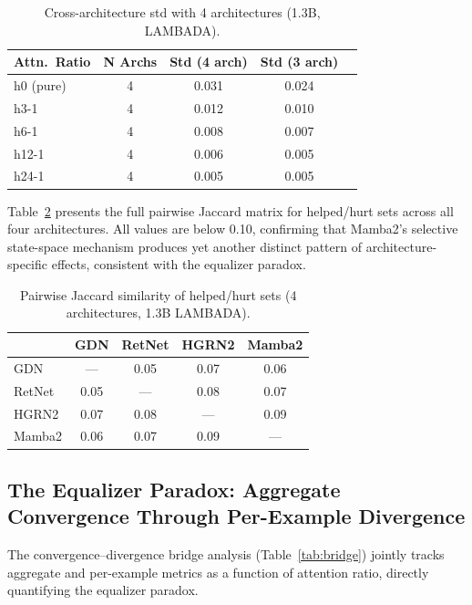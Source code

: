 \documentclass[11pt,a4paper]{article}
\begin{document}
\begin{table}[t]
\centering
\small
\caption{Cross-architecture std with 4 architectures (1.3B, LAMBADA).}
\label{tab:four-arch-std}
\begin{tabular}{lcccc}
\toprule
\textbf{Attn.\ Ratio} & \textbf{N Archs} & \textbf{Std (4 arch)} & \textbf{Std (3 arch)} \\
\midrule
h0 (pure)  & 4 & 0.031 & 0.024 \\
h3-1       & 4 & 0.012 & 0.010 \\
h6-1       & 4 & 0.008 & 0.007 \\
h12-1      & 4 & 0.006 & 0.005 \\
h24-1      & 4 & 0.005 & 0.005 \\
\bottomrule
\end{tabular}
\end{table}

Table~\ref{tab:jaccard-matrix} presents the full pairwise Jaccard matrix for helped/hurt sets across all four architectures.
All values are below 0.10, confirming that Mamba2's selective state-space mechanism produces yet another distinct pattern of architecture-specific effects, consistent with the equalizer paradox.

\begin{table}[t]
\centering
\small
\caption{Pairwise Jaccard similarity of helped/hurt sets (4 architectures, 1.3B LAMBADA).}
\label{tab:jaccard-matrix}
\begin{tabular}{lcccc}
\toprule
         & \textbf{GDN} & \textbf{RetNet} & \textbf{HGRN2} & \textbf{Mamba2} \\
\midrule
GDN    & --- & 0.05 & 0.07 & 0.06 \\
RetNet & 0.05 & --- & 0.08 & 0.07 \\
HGRN2  & 0.07 & 0.08 & --- & 0.09 \\
Mamba2 & 0.06 & 0.07 & 0.09 & --- \\
\bottomrule
\end{tabular}
\end{table}


\subsection{The Equalizer Paradox: Aggregate Convergence Through Per-Example Divergence}
\label{sec:paradox}

The convergence--divergence bridge analysis (Table~\ref{tab:bridge}) jointly tracks aggregate and per-example metrics as a function of attention ratio, directly quantifying the equalizer paradox.
\end{document}

